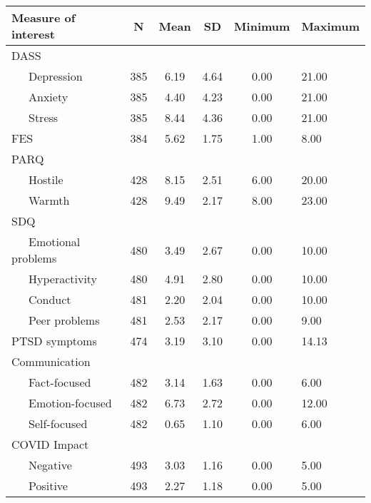 \documentclass[
  english,
  man]{apa6}
\begin{document}
\begin{table}[tbp]
\begin{center}
\begin{threeparttable}
\begin{tabular}{lccccl}
\toprule
Measure of interest & N & Mean & SD & Minimum & Maximum\\
\midrule
DASS &  &  &  &  & \\
\ \ \ Depression & 385 & 6.19 & 4.64 & 0.00 & 21.00\\
\ \ \ Anxiety & 385 & 4.40 & 4.23 & 0.00 & 21.00\\
\ \ \ Stress & 385 & 8.44 & 4.36 & 0.00 & 21.00\\
FES & 384 & 5.62 & 1.75 & 1.00 & 8.00\\
PARQ &  &  &  &  & \\
\ \ \ Hostile & 428 & 8.15 & 2.51 & 6.00 & 20.00\\
\ \ \ Warmth & 428 & 9.49 & 2.17 & 8.00 & 23.00\\
SDQ &  &  &  &  & \\
\ \ \ Emotional problems & 480 & 3.49 & 2.67 & 0.00 & 10.00\\
\ \ \ Hyperactivity & 480 & 4.91 & 2.80 & 0.00 & 10.00\\
\ \ \ Conduct & 481 & 2.20 & 2.04 & 0.00 & 10.00\\
\ \ \ Peer problems & 481 & 2.53 & 2.17 & 0.00 & 9.00\\
PTSD symptoms & 474 & 3.19 & 3.10 & 0.00 & 14.13\\
Communication &  &  &  &  & \\
\ \ \ Fact-focused & 482 & 3.14 & 1.63 & 0.00 & 6.00\\
\ \ \ Emotion-focused & 482 & 6.73 & 2.72 & 0.00 & 12.00\\
\ \ \ Self-focused & 482 & 0.65 & 1.10 & 0.00 & 6.00\\
COVID Impact &  &  &  &  & \\
\ \ \ Negative & 493 & 3.03 & 1.16 & 0.00 & 5.00\\
\ \ \ Positive & 493 & 2.27 & 1.18 & 0.00 & 5.00\\
\bottomrule
\end{tabular}

\end{threeparttable}
\end{center}

\end{table}
\end{document}
